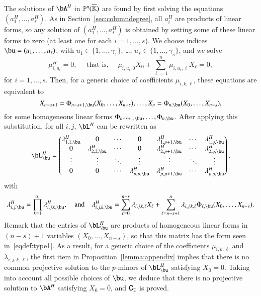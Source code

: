 \documentclass[amsthm]{elsart}
\begin{document}
The solutions of $\bA^H$ in $\mathbb{P}^n(\overline{\mathbb{K}})$ are found by first solving
the equations $(a^H_1,\dots,a^H_s)$. As in Section~\ref{sec:columndegree}, all
$a_i^H$ are products of linear forms, so any solution of
$(a^H_1,\dots,a^H_s)$ is obtained by setting some of these linear forms
to zero (at least one for each $i=1,\dots,s$). We choose indices $\bu=(u_1,\dots,u_s)$, with
$u_1\in\{1,\dots,\gamma_1\}$, \dots, $u_s\in\{1,\dots,\gamma_s\}$, and
we solve
$$\mu^H_{i,u_i}=0, \quad \text{~that is,~} \quad \mu_{i,u_i,0}X_0 + \sum_{\ell = 1}^{n}\mu_{i,u_i,\ell}X_\ell =0,$$ for $i=1,\dots,s$.
Then, for a generic choice of coefficients $\mu_{i,k,\ell}$, these equations
are equivalent to
$$X_{n-s+1}=\Phi_{n-s+1,\bu}(X_0,\dots,X_{n-s}),\dots,X_{n}=\Phi_{n,\bu}(X_0,\dots,X_{n-s}),$$
for some homogeneous linear forms $\Phi_{n-s+1,\bu},\dots,\Phi_{n,\bu}$.
After applying this substitution, for all $i,j$,
$\bL^H$ can be rewritten as 
\begin{align*}
 \bL^H_\bu = \left( \begin{matrix}
\lambda^H_{1,1,\bu} & 0 & \cdots & 0 & \lambda^H_{1,p+1,\bu} & \cdots & \lambda^H_{1, q,\bu}\\
0 & \lambda^H_{2,2,\bu} & \cdots & 0 & \lambda^H_{2,p+1,\bu} & \cdots & \lambda^H_{2, q,\bu}\\
\vdots & \vdots & \ddots & \vdots & \vdots & \ddots & \vdots\\
0 & 0 & \cdots & \lambda^H_{p,p,\bu} & \lambda^H_{p,p+1,\bu} & \cdots & \lambda^H_{p, q,\bu}
\end{matrix} \right),
\end{align*}
with
$$\lambda^H_{i,j,\bu}=\prod_{k=1}^{\alpha_i}\lambda^H_{i,j,k,\bu},
\quad\text{and}\quad \lambda^H_{i,j,k,\bu}=\sum_{\ell =
  0}^{n-s}\lambda_{i,j,k,\ell}X_\ell + \sum_{\ell =
  n-s+1}^{n}\lambda_{i,j,k,\ell} \Phi_{\ell,\bu}(X_0,\dots,X_{n-s}).$$
Remark that the entries of $\bL^H_\bu$ are products of homogeneous
linear forms in $(n-s)+1$ variables $(X_0,\dots,X_{n-s})$, so that
this matrix has the form seen in~\eqref{eqdef:type1}. As a result, for
a generic choice of the coefficients $\mu_{i,k,\ell}$ and
$\lambda_{i,j,k,\ell}$, the first item in
Proposition~\ref{lemma:appendix} implies that there is no common projective
solution to the $p$-minors of 
$\bL^H_\bu$ satisfying $X_0=0$. Taking into account
all possible choices of $\bu$, we deduce that there is no projective
solution to $\bA^H$ satisfying $X_0=0$, and $\mathsf{C}_2$ is proved.
\end{document}

